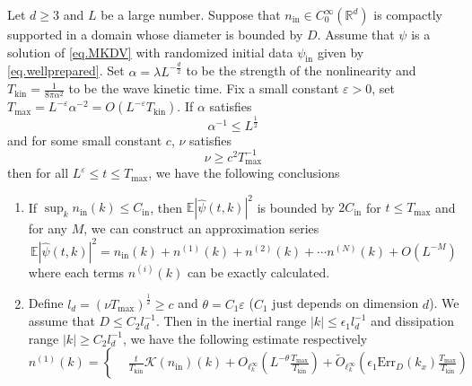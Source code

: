 \begin{thm}\label{th.main}
Let $d\ge 3$ and $L$ be a large number. Suppose that $n_{\mathrm{in}} \in C^\infty_0(\mathbb{R}^d)$ is compactly supported in a domain whose diameter is bounded by $D$. Assume that $\psi$ is a solution of \eqref{eq.MKDV} with randomized initial data $\psi_{\mathrm{in}}$ given by \eqref{eq.wellprepared}. Set $\alpha=\lambda L^{-\frac{d}{2}}$ to be the strength of the nonlinearity and $T_{\mathrm{kin}}=\frac{1}{8\pi\alpha^2}$ to be the wave kinetic time. Fix a small constant $\varepsilon> 0$, set $T_{\text{max}} = L^{-\varepsilon} \alpha^{-2}=O(L^{-\varepsilon}T_{\mathrm{kin}})$. If $\alpha$ satisfies
\begin{equation}\label{eq.conditionalpha}
\alpha^{-1}\le L^{\frac{1}{2}}
\end{equation}
and for some small constant $c$, $\nu$ satisfies
\begin{equation}\label{eq.conditionnu}
\nu\ge c^2T^{-1}_{\text{max}}
\end{equation}
then for all $L^{\varepsilon} \leq t \leq T_{\text{max}}$, we have the following conclusions
\begin{enumerate}
    \item If $\sup_{k}n_{\mathrm{in}}(k)\le C_{\mathrm{in}}$, then $\mathbb E |\widehat \psi(t, k)|^2$ is bounded by $2C_{\mathrm{in}}$ for $t\le T_{\text{max}}$ and for any $M$, we can construct an approximation series 
    \begin{equation}\label{eq.approx1}
        \mathbb E |\widehat \psi(t, k)|^2=n_{\mathrm{in}}(k)+n^{(1)}(k)+n^{(2)}(k)+\cdots n^{(N)}(k)+O(L^{-M})
    \end{equation}
    where each terms $n^{(i)}(k)$ can be exactly calculated.
    \item Define $l_{d}=(\nu T_{\mathrm{max}})^{\frac{1}{2}}\ge c$ and  $\theta=C_1\varepsilon$ ($C_1$ just depends on dimension $d$). We assume that $D\le C_2 l_d^{-1}$. Then in the inertial range $|k|\le \epsilon_1 l_{d}^{-1}$ and dissipation range $|k|\ge C_{2}l_d^{-1}$, we have the following estimate respectively
    \begin{equation}\label{eq.n1}
        n^{(1)}(k)=\left\{
        \begin{aligned}
            &\frac{t}{T_{\mathrm{kin}}}\mathcal K(n_{\mathrm{in}})(k)+O_{\ell^\infty_k}\left(L^{-\theta}\frac{T_{\text{max}}}{T_{\mathrm {kin}}}\right)+\widetilde{O}_{\ell^\infty_k}\left(\epsilon_1\text{Err}_{D}(k_x)\frac{T_{\text{max}}}{T_{\mathrm {kin}}}\right)

\end{aligned}
\end{equation}
\end{enumerate}
\end{thm}

